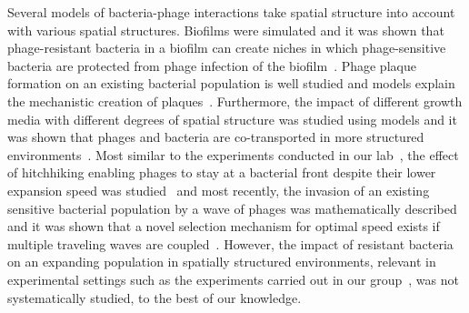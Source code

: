 Several models of bacteria-phage interactions take spatial structure into account with various spatial structures. Biofilms were simulated and it was shown that phage-resistant bacteria in a biofilm can create niches in which phage-sensitive bacteria are protected from phage infection of the biofilm~\cite{Simmons2020-cc}. Phage plaque formation on an existing bacterial population is well studied and models explain the mechanistic creation of plaques~\cite{Valdez2025-io, Smith2011-ae, Yin1992-th}. Furthermore, the impact of different growth media with different degrees of spatial structure was studied using models and it was shown that phages and bacteria are co-transported in more structured environments~\cite{Wang2024-ye}. Most similar to the experiments conducted in our lab~\cite{Shaer-Tamar2022-cq}, the effect of hitchhiking enabling phages to stay at a bacterial front despite their lower expansion speed was studied~\cite{Ping2020-vd} and most recently, the invasion of an existing sensitive bacterial population by a wave of phages was mathematically described and it was shown that a novel selection mechanism for optimal speed exists if multiple traveling waves are coupled~\cite{Claydon2021-cu}. However, the impact of resistant bacteria on an expanding population in spatially structured environments, relevant in experimental settings such as the experiments carried out in our group~\cite{Shaer-Tamar2022-cq}, was not systematically studied, to the best of our knowledge.